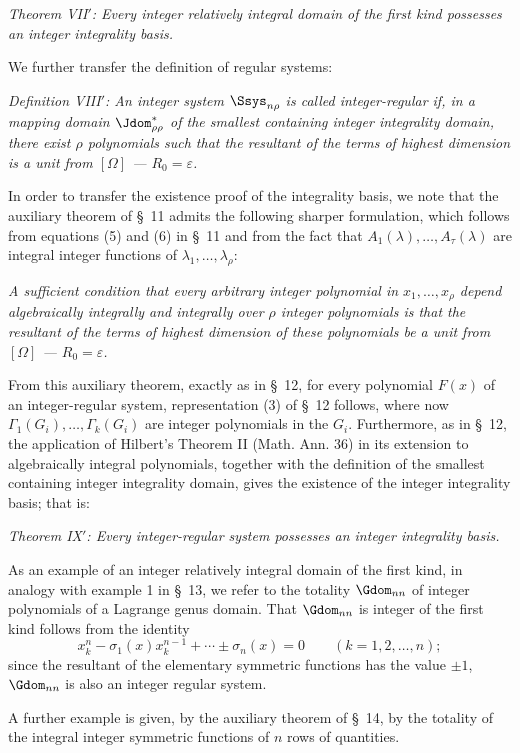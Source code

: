 \documentclass[11pt]{article}
\providecommand{\eps}{\varepsilon}
\begin{document}
\emph{Theorem VII$'$: Every integer relatively integral domain of the first kind possesses an integer integrality basis.}

We further transfer the definition of regular systems:

\emph{Definition VIII$'$: An integer system $\Ssys_{n\rho}$ is called integer-regular if, in a mapping domain $\Jdom^*_{\rho\rho}$ of the smallest containing integer integrality domain, there exist $\rho$ polynomials such that the resultant of the terms of highest dimension is a unit from $[\Omega]$ --- $R_0=\eps$.}

In order to transfer the existence proof of the integrality basis, we note that the auxiliary theorem of \S\ 11 admits the following sharper formulation, which follows from equations (5) and (6) in \S\ 11 and from the fact that $A_1(\lambda),
\ldots,A_\tau(\lambda)$ are integral integer functions of $\lambda_1,
\ldots,
\lambda_\rho$:

\emph{A sufficient condition that every arbitrary integer polynomial in $x_1,
\ldots,x_\rho$ depend algebraically integrally and integrally over $\rho$ integer polynomials is that the resultant of the terms of highest dimension of these polynomials be a unit from $[\Omega]$ --- $R_0=\eps$.}

From this auxiliary theorem, exactly as in \S\ 12, for every polynomial $F(x)$ of an integer-regular system, representation (3) of \S\ 12 follows, where now $\Gamma_1(G_i),
\ldots,
\Gamma_k(G_i)$ are integer polynomials in the $G_i$. Furthermore, as in \S\ 12, the application of Hilbert's Theorem II (Math. Ann. 36) in its extension to algebraically integral polynomials, together with the definition of the smallest containing integer integrality domain, gives the existence of the integer integrality basis; that is:

\emph{Theorem IX$'$: Every integer-regular system possesses an integer integrality basis.}

As an example of an integer relatively integral domain of the first kind, in analogy with example 1 in \S\ 13, we refer to the totality $\Gdom_{nn}$ of integer polynomials of a Lagrange genus domain. That $\Gdom_{nn}$ is integer of the first kind follows from the identity
\[
  x_k^n-\sigma_1(x)x_k^{n-1}+\cdots\pm\sigma_n(x)=0
  \qquad(k=1,2,
\ldots,n);
\]
since the resultant of the elementary symmetric functions has the value $\pm1$, $\Gdom_{nn}$ is also an integer regular system.

A further example is given, by the auxiliary theorem of \S\ 14, by the totality of the integral integer symmetric functions of $n$ rows of quantities.
\end{document}
